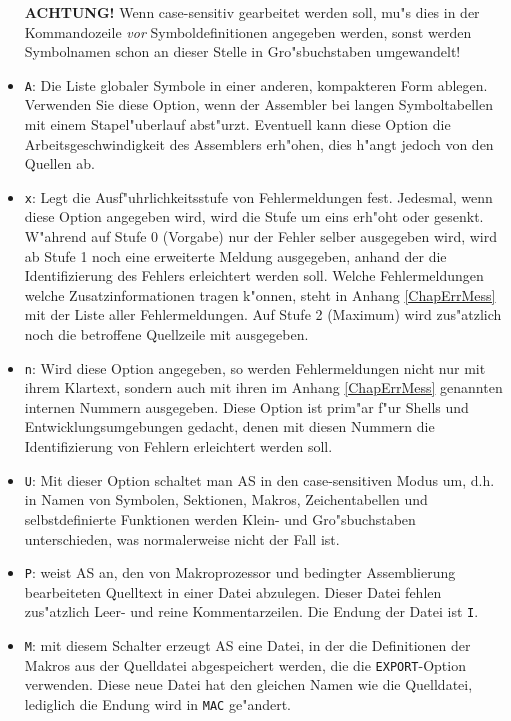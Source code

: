 \documentclass[12pt,a4paper,twoside]{report}
\newcommand{\tty}[1]{{\tt #1}}
\begin{document}
\begin{itemize}
{      {\bf ACHTUNG!} Wenn case-sensitiv gearbeitet werden soll, mu"s dies
      in der Kommandozeile {\em vor} Symboldefinitionen angegeben werden,
      sonst werden Symbolnamen schon an dieser Stelle in Gro"sbuchstaben
      umgewandelt!}
\item{\tty{A}: Die Liste globaler Symbole in einer anderen, kompakteren Form
      ablegen.  Verwenden Sie diese Option, wenn der Assembler bei
      langen Symboltabellen mit einem Stapel"uberlauf abst"urzt.
      Eventuell kann diese Option die Arbeitsgeschwindigkeit des
      Assemblers erh"ohen, dies h"angt jedoch von den Quellen ab.}
\item{\tty{x}: Legt die Ausf"uhrlichkeitsstufe von Fehlermeldungen fest.
      Jedesmal, wenn diese Option angegeben wird, wird die Stufe
      um eins erh"oht oder gesenkt.  W"ahrend auf Stufe 0 (Vorgabe) nur
      der Fehler selber ausgegeben wird, wird ab Stufe 1 noch eine
      erweiterte Meldung ausgegeben, anhand der die Identifizierung des
      Fehlers erleichtert werden soll.  Welche Fehlermeldungen welche
      Zusatzinformationen tragen k"onnen, steht in Anhang \ref{ChapErrMess}
      mit der Liste aller Fehlermeldungen.  Auf Stufe 2 (Maximum) wird
      zus"atzlich noch die betroffene Quellzeile mit ausgegeben.}
\item{\tty{n}: Wird diese Option angegeben, so werden Fehlermeldungen nicht nur
      mit ihrem Klartext, sondern auch mit ihren im Anhang
      \ref{ChapErrMess} genannten internen Nummern ausgegeben.  Diese
      Option ist prim"ar f"ur Shells und Entwicklungsumgebungen gedacht,
      denen mit diesen Nummern die Identifizierung von Fehlern erleichtert
      werden soll.}
\item{\tty{U}: Mit dieser Option schaltet man AS in den case-sensitiven
      Modus um, d.h. in Namen von Symbolen, Sektionen, Makros,
      Zeichentabellen und selbstdefinierte Funktionen werden Klein-
      und Gro"sbuchstaben unterschieden, was normalerweise nicht der
      Fall ist.}
\item{\tty{P}: weist AS an, den von Makroprozessor und bedingter Assemblierung
      bearbeiteten Quelltext in einer Datei abzulegen.  Dieser Datei
      fehlen zus"atzlich Leer- und reine Kommentarzeilen.  Die Endung
      der Datei ist \tty{I}.}
\item{\tty{M}: mit diesem Schalter erzeugt AS eine Datei, in der die Definitionen
      der Makros aus der Quelldatei abgespeichert werden, die die
      \tty{EXPORT}-Option verwenden.  Diese neue Datei hat den gleichen
      Namen wie die Quelldatei, lediglich die Endung wird in \tty{MAC} ge"andert.}

\end{itemize}
\end{document}
